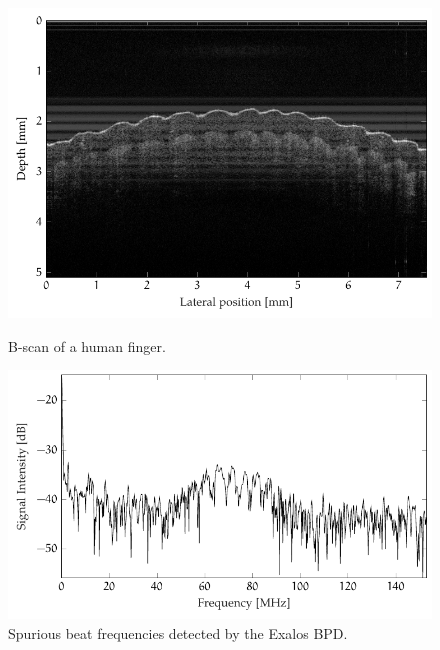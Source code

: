 \begin{figure}[hbt]
	\myfloatalign
	{\includegraphics[width=\linewidth]{gfx/tikz/axsun/finger}}
	\caption{B-scan of a human finger.}\label{fig:finger}
\end{figure}%


\begin{figure}[hbt]
\myfloatalign
\includegraphics[width=\linewidth]{gfx/tikz/axsun/spurious-frequencies}
\caption{Spurious beat frequencies detected by the Exalos \ac{BPD}.}\label{fig:spurious-frequencies}
\end{figure}%







